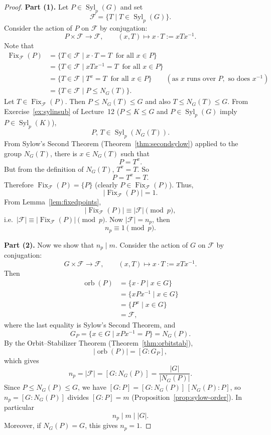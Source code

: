 \documentclass[11pt,a4paper]{article}
\newcommand{\Fix}{\operatorname{Fix}}
\newcommand{\orb}{\operatorname{orb}}
\DeclareMathOperator{\Syl}{Syl}
\begin{document}
	
	\begin{proof}
		\textbf{Part (1).} Let $P \in \Syl_p(G)$ and set
		\[
		\mathcal{F} = \{ T \mid T \in \Syl_p(G) \}.
		\]
		Consider the action of $P$ on $\mathcal{F}$ by conjugation:
		\[
		P \times \mathcal{F} \longrightarrow \mathcal{F}, \qquad (x, T) \longmapsto x \cdot T := xTx^{-1}.
		\]
		Note that
		\begin{align*}
			\Fix_{\mathcal{F}}(P) &= \{ T \in \mathcal{F} \mid x \cdot T = T \ \text{ for all } x \in P \}\\
			&= \{ T \in \mathcal{F} \mid xTx^{-1} = T \ \text{ for all } x \in P \}\\
			&= \{ T \in \mathcal{F} \mid T^{x} = T \ \text{ for all } x \in P \} \qquad (\text{as } x \text{ runs over } P, \text{ so does } x^{-1})\\
			&= \{ T \in \mathcal{F} \mid P \leq N_G(T) \}.
		\end{align*}
		Let $T \in \Fix_{\mathcal{F}}(P)$. Then $P \leq N_G(T) \leq G$ and also $T \leq N_G(T) \leq G$. From Exercise~\ref{ex:sylinsub} of Lecture~12 ($P \leq K \leq G$ and $P \in \Syl_p(G)$ imply $P \in \Syl_p(K)$),
		\[
		P,\, T \in \Syl_p(N_G(T)).
		\]
		From Sylow's Second Theorem (Theorem~\ref{thm:secondsylow}) applied to the group $N_G(T)$, there is $x \in N_G(T)$ such that
		\[
		P = T^{x}.
		\]
		But from the definition of $N_G(T)$, $T^{x} = T$. So
		\[
		P = T^{x} = T.
		\]
		Therefore $\Fix_{\mathcal{F}}(P) = \{P\}$ (clearly $P \in \Fix_{\mathcal{F}}(P)$). Thus,
		\[
		|\Fix_{\mathcal{F}}(P)| = 1.
		\]
		From Lemma~\ref{lem:fixedpoints},
		\[
		|\Fix_{\mathcal{F}}(P)| \equiv |\mathcal{F}| \pmod{p},
		\]
		i.e.\ $|\mathcal{F}| \equiv |\Fix_{\mathcal{F}}(P)| \pmod{p}$. Now $|\mathcal{F}| = n_p$, then
		\[
		n_p \equiv 1 \pmod{p}.
		\]
		
		\vspace{0.5em}
		\noindent \textbf{Part (2).} Now we show that $n_p \mid m$. Consider the action of $G$ on $\mathcal{F}$ by conjugation:
		\[
		G \times \mathcal{F} \longrightarrow \mathcal{F}, \qquad (x, T) \longmapsto x \cdot T := xTx^{-1}.
		\]
		Then
		\begin{align*}
			\orb(P) &= \{ x \cdot P \mid x \in G \}\\
			&= \{ xPx^{-1} \mid x \in G \}\\
			&= \{ P^{x} \mid x \in G \}\\
			&= \mathcal{F},
		\end{align*}
		where the last equality is Sylow's Second Theorem, and
		\[
		G_P = \{ x \in G \mid xPx^{-1} = P \} = N_G(P).
		\]
		By the Orbit--Stabilizer Theorem (Theorem~\ref{thm:orbitstab}),
		\[
		|\orb(P)| = [G : G_P],
		\]
		which gives
		\[
		n_p = |\mathcal{F}| = [G : N_G(P)] = \frac{|G|}{|N_G(P)|}.
		\]
		Since $P \le N_G(P) \le G$, we have $[G:P] = [G:N_G(P)]\,[N_G(P):P]$, so $n_p = [G : N_G(P)]$ divides $[G:P] = m$ (Proposition~\ref{prop:sylow-order}). In particular
		\[
		n_p \mid m \mid |G|.
		\]
		Moreover, if $N_G(P) = G$, this gives $n_p = 1$.
	\end{proof}
	
\end{document}
